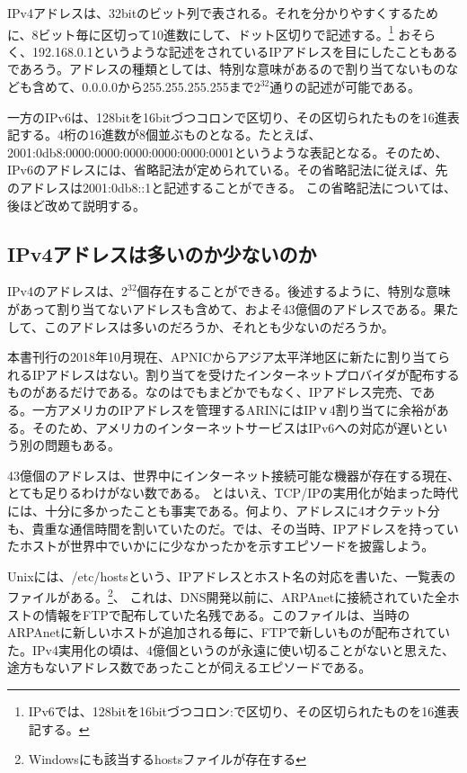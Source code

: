 IPv4アドレスは、32bitのビット列で表される。それを分かりやすくするために、8ビット毎に区切って10進数にして、ドット区切りで記述する。\footnote{IPv6では、128bitを16bitづつコロン:で区切り、その区切られたものを16進表記する。} おそらく、192.168.0.1というような記述をされているIPアドレスを目にしたこともあるであろう。アドレスの種類としては、特別な意味があるので割り当てないものなども含めて、0.0.0.0から255.255.255.255まで$2^{32}$通りの記述が可能である。

一方のIPv6は、128bitを16bitづつコロンで区切り、その区切られたものを16進表記する。4桁の16進数が8個並ぶものとなる。たとえば、2001:0db8:0000:0000:0000:0000:0000:0001というような表記となる。そのため、IPv6のアドレスには、省略記法が定められている。その省略記法に従えば、先のアドレスは2001:0db8::1と記述することができる。
この省略記法については、後ほど改めて説明する。



\subsection{IPv4アドレスは多いのか少ないのか}
IPv4のアドレスは、$2^{32}$個存在することができる。後述するように、特別な意味があって割り当てないアドレスも含めて、およそ43億個のアドレスである。果たして、このアドレスは多いのだろうか、それとも少ないのだろうか。

本書刊行の2018年10月現在、APNICからアジア太平洋地区に新たに割り当てられるIPアドレスはない。割り当てを受けたインターネットプロバイダが配布するものがあるだけである。なのはでもまどかでもなく、IPアドレス完売、である。一方アメリカのIPアドレスを管理するARINにはIPｖ4割り当てに余裕がある。そのため、アメリカのインターネットサービスはIPv6への対応が遅いという別の問題もある。

43億個のアドレスは、世界中にインターネット接続可能な機器が存在する現在、とても足りるわけがない数である。
とはいえ、TCP/IPの実用化が始まった時代には、十分に多かったことも事実である。何より、アドレスに4オクテット分も、貴重な通信時間を割いていたのだ。では、その当時、IPアドレスを持っていたホストが世界中でいかにに少なかったかを示すエピソードを披露しよう。

Unixには、/etc/hostsという、IPアドレスとホスト名の対応を書いた、一覧表のファイルがある。\footnote{Windowsにも該当するhostsファイルが存在する}、
これは、DNS開発以前に、ARPAnetに接続されていた全ホストの情報をFTPで配布していた名残である。このファイルは、当時のARPAnetに新しいホストが追加される毎に、FTPで新しいものが配布されていた。IPv4実用化の頃は、4億個というのが永遠に使い切ることがないと思えた、途方もないアドレス数であったことが伺えるエピソードである。


